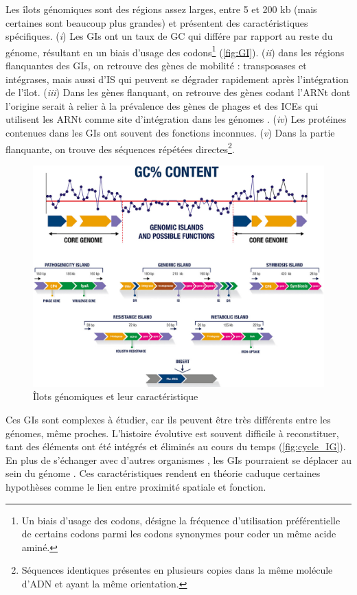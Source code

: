 Les îlots génomiques sont des régions assez larges, entre 5 et 200 kb (mais certaines sont beaucoup plus grandes) et présentent des caractéristiques spécifiques. (\textit{i}) Les GIs ont un taux de GC qui différe par rapport au reste du génome, résultant en un biais d'usage des codons\footnote{Un biais d'usage des codons, désigne la fréquence d’utilisation préférentielle de certains codons parmi les codons synonymes pour coder un même acide aminé.} (\autoref{fig:GI}). (\textit{ii}) dans les régions flanquantes des GIs, on retrouve des gènes de mobilité : transposases et intégrases, mais aussi d'IS qui peuvent se dégrader rapidement après l'intégration de l'îlot. (\textit{iii}) Dans les gènes flanquant, on retrouve des gènes codant l'ARNt dont l'origine serait à relier à la prévalence des gènes de phages et des ICEs qui utilisent les ARNt comme site d'intégration dans les génomes \cite{dobrindt_genomic_2004}. (\textit{iv}) Les protéines contenues dans les GIs ont souvent des fonctions inconnues. (\textit{v}) Dans la partie flanquante, on trouve des séquences répétées directes\footnote{Séquences identiques présentes en plusieurs copies dans la même molécule d'ADN et ayant la même orientation.}.

\begin{figure}[htbp]
    \centering
    \includegraphics[width=0.8\linewidth]{images/ilot_genomique.jpg}
    \caption[Îlots génomiques et leur caractéristique]{Îlots génomiques et leur caractéristique \cite{da_silva_filho_comparative_2018}}
    \label{fig:GI}
\end{figure}

Ces GIs sont complexes à étudier, car ils peuvent être très différents entre les génomes, même proches. L'histoire évolutive est souvent difficile à reconstituer, tant des éléments ont été intégrés et éliminés au cours du temps (\autoref{fig:cycle_IG}). En plus de s'échanger avec d'autres organismes \cite{buchrieser_high-pathogenicity_1998}, les GIs pourraient se déplacer au sein du génome \cite{karaolis_bacteriophage_1999}. Ces caractéristiques rendent en théorie caduque certaines hypothèses comme le lien entre proximité spatiale et fonction. 

